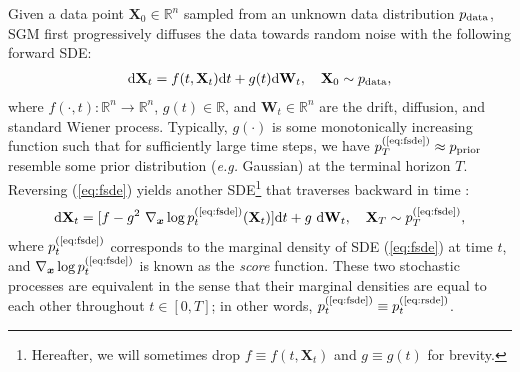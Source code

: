 \documentclass{article}
\def\eqref#1{(\ref{#1})}
\def\rd{{\textnormal{d}}}
\def\rvX{{\mathbf{X}}}
\def\vx{{\bm{x}}}
\newcommand{\pdata}{p_{\rm{data}}}
\def\wt{{ \mathbf{W}_t }}
\def\dwt{{ \mathrm{d} \wt }}
\def\dt{{ \mathrm{d} t }}
\newcommand{\eg}{{\ignorespaces\emph{e.g.}}{ }}
\begin{document}
Given a data point $\rvX_0 \in \mathbb{R}^n$ sampled from an unknown data distribution $\pdata$,
SGM first progressively diffuses the data towards random noise with the following {forward SDE}:
  \begin{align}
    \rd \rvX_t = f(t, \rvX_t) \dt + g(t) \dwt, \quad \rvX_0 \sim \pdata,
    \label{eq:fsde}
  \end{align}
where $f(\cdot,t): \mathbb{R}^n \rightarrow \mathbb{R}^n $,
$g(t)\in \mathbb{R}$, and $\wt \in \mathbb{R}^n$
are the drift, diffusion, and standard Wiener process.
Typically, $g(\cdot)$ is
some monotonically increasing function
such that for sufficiently large time steps, we have $\pp{T}{\eqref{eq:fsde}} \approx \prior$ resemble some prior distribution (\eg Gaussian)
at the terminal horizon $T$.
Reversing \eqref{eq:fsde} yields another {SDE}\footnote{
    Hereafter, we will sometimes drop $f \equiv f(t,\rvX_t)$ and $g \equiv g(t)$ for brevity.
} that traverses backward in time \citep{anderson1982reverse}:
\begin{align}
\rd \rvX_t = [f - g^2~\nabla_\vx \log \pp{t}{\eqref{eq:fsde}}(\rvX_t) ] \dt + g~\dwt,
\quad \rvX_T \sim \pp{T}{\eqref{eq:fsde}},
\label{eq:rsde}
\end{align}
where {$p_{t}^\text{\eqref{eq:fsde}}$ corresponds to the marginal density of SDE \eqref{eq:fsde} at time $t$,}
and $\nabla_\vx \log \pp{t}{\eqref{eq:fsde}}$ is
known as the \textit{score} function.
These two stochastic processes
are equivalent in the sense that their marginal densities are equal to each other throughout $t\in[0,T]$;
in other words,
$\pp{t}{\eqref{eq:fsde}} \equiv \pp{t}{\eqref{eq:rsde}}$.


\def\condscore{{ \nabla_\vx\log p_{t|\vx_0} }}
\end{document}
